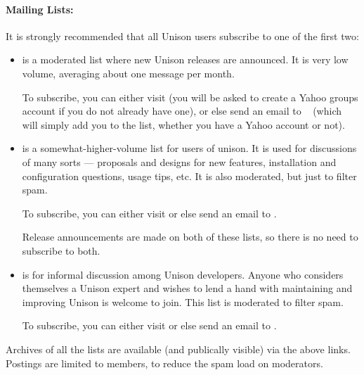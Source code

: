 \paragraph{Mailing Lists:}

It is strongly recommended that all Unison users subscribe to one of the
first two:  
\begin{itemize}
\item {\bf
  }
is a moderated list where new Unison releases are announced.  It is very
low volume, averaging about one message per month. 

To subscribe, you can either visit 
   (you will be
  asked to create a Yahoo groups account if you do not already have one),
  or else send an email to
  {\tt
  }
  (which will 
  simply add you to the list, whether you have a Yahoo account or not).

  \item {\bf
    } is a
  somewhat-higher-volume list for users of unison.  It is used for
  discussions of many sorts --- proposals and designs for new features,
  installation and configuration questions, usage tips, etc.  It is also
  moderated, but just to filter spam.

To subscribe, you can either visit 
  or else send an email to
  {\tt {}}.

Release announcements are made on both of these lists, so there is
no need to subscribe to both.

\item {\bf
  } is
for informal discussion among Unison developers.  Anyone who considers
themselves a Unison expert and wishes to lend a hand with maintaining and
improving Unison is welcome to join.  This list is moderated to filter
spam.  

To subscribe, you can either visit 
  or else send an email to
  {\tt {}}.
\end{itemize}
Archives of all the lists are available (and publically visible) via the
above links. Postings are limited to members, to reduce the spam load on moderators.

